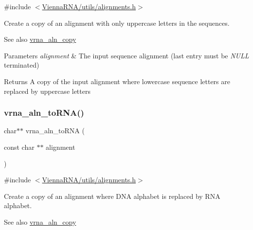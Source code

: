 {\ttfamily \#include $<$\hyperlink{utils_2alignments_8h}{Vienna\+R\+N\+A/utils/alignments.\+h}$>$}



Create a copy of an alignment with only uppercase letters in the sequences. 

\begin{DoxySeeAlso}{See also}
\hyperlink{group__aln__utils_ga08cdca592461436860daf9738279ce17}{vrna\+\_\+aln\+\_\+copy}
\end{DoxySeeAlso}

\begin{DoxyParams}{Parameters}
{\em alignment} & The input sequence alignment (last entry must be {\itshape N\+U\+LL} terminated) \\
\hline
\end{DoxyParams}
\begin{DoxyReturn}{Returns}
A copy of the input alignment where lowercase sequence letters are replaced by uppercase letters 
\end{DoxyReturn}
\mbox{\label{group__aln__utils_ga7886fc678553c06472a712a335cde9cf}} 
\subsubsection{\texorpdfstring{vrna\+\_\+aln\+\_\+to\+R\+N\+A()}{vrna\_aln\_toRNA()}}
{\footnotesize\ttfamily char$\ast$$\ast$ vrna\+\_\+aln\+\_\+to\+R\+NA (\begin{DoxyParamCaption}\item[{const char $\ast$$\ast$}]{alignment }\end{DoxyParamCaption})}



{\ttfamily \#include $<$\hyperlink{utils_2alignments_8h}{Vienna\+R\+N\+A/utils/alignments.\+h}$>$}



Create a copy of an alignment where D\+NA alphabet is replaced by R\+NA alphabet. 

\begin{DoxySeeAlso}{See also}
\hyperlink{group__aln__utils_ga08cdca592461436860daf9738279ce17}{vrna\+\_\+aln\+\_\+copy}
\end{DoxySeeAlso}

